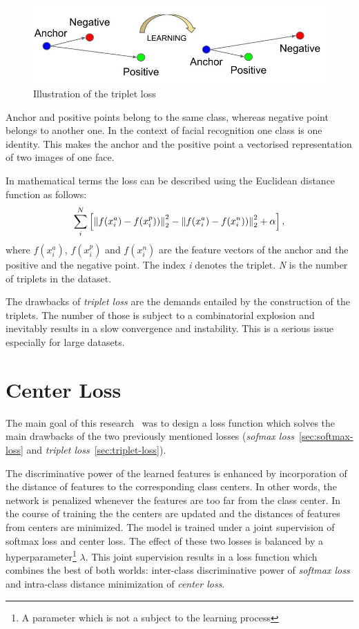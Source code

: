 \begin{figure}[H]
    \centering
    \includegraphics[width=\columnwidth]{images/face-recognition/tripletloss.jpeg}
    \caption{Illustration of the triplet loss~\cite{TripletLoss}}
    \label{fig:tripletloss}
\end{figure}

Anchor and positive points belong to the same class, whereas negative point belongs to another one.
In the context of facial recognition one class is one identity.
This makes the anchor and the positive point a vectorised representation of two images of one face.

In mathematical terms the loss can be described using the Euclidean distance function as follows:
\begin{equation}
    \sum_{i}^{N} \left[ \left\lVert f(x_{i}^{a}) - f(x_{i}^{p}))\right\rVert^2_2
    - \left\lVert f(x_{i}^{a}) - f(x_{i}^{n}))\right\rVert^2_2 + \alpha \right],
\end{equation}
where $f(x_{i}^{a})$, $f(x_{i}^{p})$ and $f(x_{i}^{n})$ are the feature vectors of the anchor and the positive and the
negative point.
The index \textit{i} denotes the triplet.
\textit{N} is the number of triplets in the dataset.

The drawbacks of \textit{triplet loss} are the demands entailed by the construction of the triplets.
The number of those is subject to a combinatorial explosion and inevitably results in a slow convergence and
instability.
This is a serious issue especially for large datasets.

\section{Center Loss}\label{sec:center-loss}
The main goal of this research~\cite{CenterLoss} was to design a loss function which solves the main drawbacks of
the two previously mentioned losses
(\textit{sofmax loss}~\ref{sec:softmax-loss} and \textit{triplet loss}~\ref{sec:triplet-loss}).

The discriminative power of the learned features is enhanced by incorporation of the distance of features to the
corresponding class centers.
In other words, the network is penalized whenever the features are too far from the class center.
In the course of training the the centers are updated and the distances of features from centers are minimized.
The model is trained under a joint supervision of softmax loss and center loss.
The effect of these two losses is balanced by a hyperparameter\footnote{A parameter which is not a subject to the
learning process} $\lambda$.
This joint supervision results in a loss function which combines the best of both worlds:
inter-class discriminative power of \textit{softmax loss} and intra-class distance minimization of \textit{center loss}.

